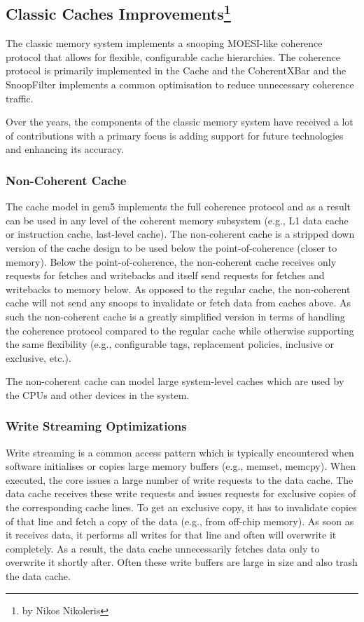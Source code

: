\subsection[Classic Caches Improvements]{Classic Caches Improvements\footnote{by Nikos Nikoleris}}

The classic memory system implements a snooping MOESI-like coherence protocol that allows for flexible, configurable cache hierarchies.
The coherence protocol is primarily implemented in the Cache and the CoherentXBar and the SnoopFilter implements a common optimisation to reduce unnecessary coherence traffic.

Over the years, the components of the classic memory system have received a lot of contributions with a primary focus is adding support for future technologies and enhancing its accuracy.

\subsubsection[Non-Coherent Cache]{Non-Coherent Cache}
The cache model in gem5 implements the full coherence protocol and as a result can be used in any level of the coherent memory subsystem (e.g., L1 data cache or instruction cache, last-level cache).
The non-coherent cache is a stripped down version of the cache design to be used below the point-of-coherence (closer to memory).
Below the point-of-coherence, the non-coherent cache receives only requests for fetches and writebacks and itself send requests for fetches and writebacks to memory below. As opposed to the regular cache, the non-coherent cache will not send any snoops to invalidate or fetch data from caches above.
As such the non-coherent cache is a greatly simplified version in terms of handling the coherence protocol compared to the regular cache while otherwise supporting the same flexibility (e.g., configurable tags, replacement policies, inclusive or exclusive, etc.).

The non-coherent cache can model large system-level caches which are used by the CPUs and other devices in the system.

\subsubsection[Write Streaming Optimizations]{Write Streaming Optimizations}

Write streaming is a common access pattern which is typically encountered when software initialises or copies large memory buffers (e.g., memset, memcpy).
When executed, the core issues a large number of write requests to the data cache. The data cache receives these write requests and issues requests for exclusive copies of the corresponding cache lines. To get an exclusive copy, it has to invalidate copies of that line and fetch a copy of the data (e.g., from off-chip memory). As soon as it receives data, it performs all writes for that line and often will overwrite it completely. As a result, the data cache unnecessarily fetches data only to overwrite it shortly after. Often these write buffers are large in size and also trash the data cache.

